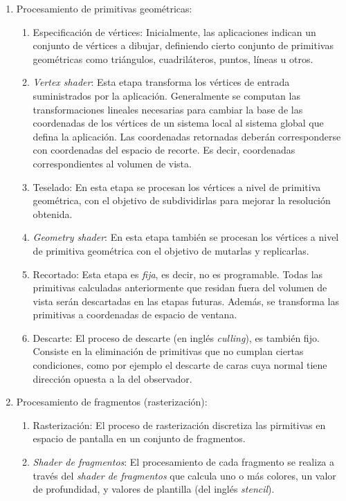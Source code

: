 \begin{enumerate}
	\item Procesamiento de primitivas geométricas:
		\begin{enumerate}
			\item Especificación de vértices: Inicialmente, las aplicaciones indican un conjunto de vértices a dibujar, definiendo cierto conjunto de primitivas geométricas como triángulos, cuadriláteros, puntos, líneas u otros.
			\item \textit{Vertex shader}: Esta etapa transforma los vértices de entrada suministrados por la aplicación. Generalmente se computan las transformaciones lineales necesarias para cambiar la base de las coordenadas de los vértices de un sistema local al sistema global que defina la aplicación. Las coordenadas retornadas deberán corresponderse con coordenadas del espacio de recorte. Es decir, coordenadas correspondientes al volumen de vista.
			\item Teselado: En esta etapa se procesan los vértices a nivel de primitiva geométrica, con el objetivo de subdividirlas para mejorar la resolución obtenida.
			\item \textit{Geometry shader}: En esta etapa también se procesan los vértices a nivel de primitiva geométrica con el objetivo de mutarlas y replicarlas.
			\item Recortado: Esta etapa es \textit{fija}, es decir, no es programable. Todas las primitivas calculadas anteriormente que residan fuera del volumen de vista serán descartadas en las etapas futuras. Además, se transforma las primitivas a coordenadas de espacio de ventana.
			\item Descarte: El proceso de descarte (en inglés \textit{culling}), es también fijo. Consiste en la eliminación de primitivas que no cumplan ciertas condiciones, como por ejemplo el descarte de caras cuya normal tiene dirección opuesta a la del observador.
		\end{enumerate}
	\item Procesamiento de fragmentos (rasterización):
		\begin{enumerate}
			\item Rasterización: El proceso de rasterización discretiza las pirmitivas en espacio de pantalla en un conjunto de fragmentos.
			\item \textit{Shader de fragmentos}: El procesamiento de cada fragmento se realiza a través del \textit{shader de fragmentos} que calcula uno o más colores, un valor de profundidad, y valores de plantilla (del inglés \textit{stencil}).

\end{enumerate}
\end{enumerate}
